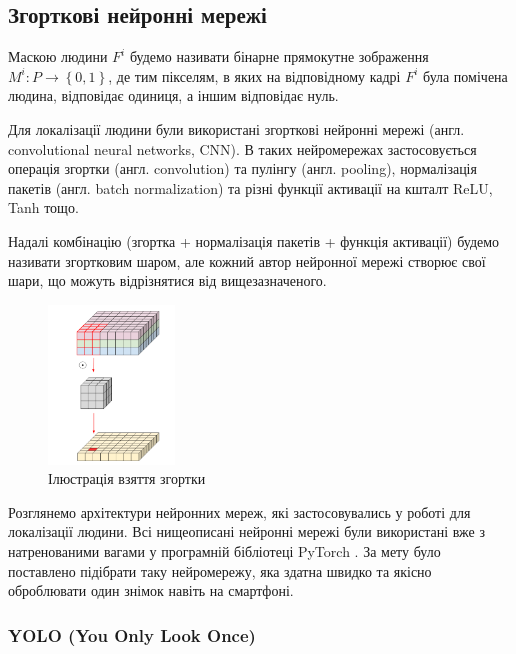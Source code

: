\subsection{Згорткові нейронні мережі}

\begin{definition}
    Маскою людини \(F^{i}\) будемо називати бінарне прямокутне
    зображення \(M^{i}:P \rightarrow \left\{ 0,1 \right\}\), де тим
    пікселям, в яких на відповідному кадрі \(F^{i}\) була помічена людина,
    відповідає одиниця, а іншим відповідає нуль.
\end{definition}
Для локалізації людини були використані згорткові нейронні мережі
(англ. convolutional neural networks, CNN).
В таких нейромережах застосовується операція згортки (англ. convolution)
та пулінгу (англ. pooling), нормалізація пакетів (англ. batch normalization)
та різні функції активації на кшталт ReLU, Tanh тощо.

Надалі комбінацію (згортка + нормалізація пакетів + функція активації)
будемо називати згортковим шаром, але кожний автор нейронної мережі
створює свої шари, що можуть відрізнятися від вищезазначеного.

\begin{figure}[H]
    \centering
    \includegraphics[width=0.3\textwidth]{images/cnn_conv_operation}
    \caption{Ілюстрація взяття згортки  \cite{website:deep_wise_sep_conv}
        \label{fig:cnn:conv_operation}
    }
\end{figure}

Розглянемо архітектури нейронних мереж, які застосовувались у роботі
для локалізації людини. Всі нищеописані нейронні мережі були використані вже з
натренованими вагами у програмній бібліотеці PyTorch \cite{bib:pytorch_library}.
За мету було поставлено підібрати таку нейромережу, яка здатна швидко та якісно оброблювати
один знімок навіть на смартфоні.

\subsubsection{YOLO (You Only Look Once)}

